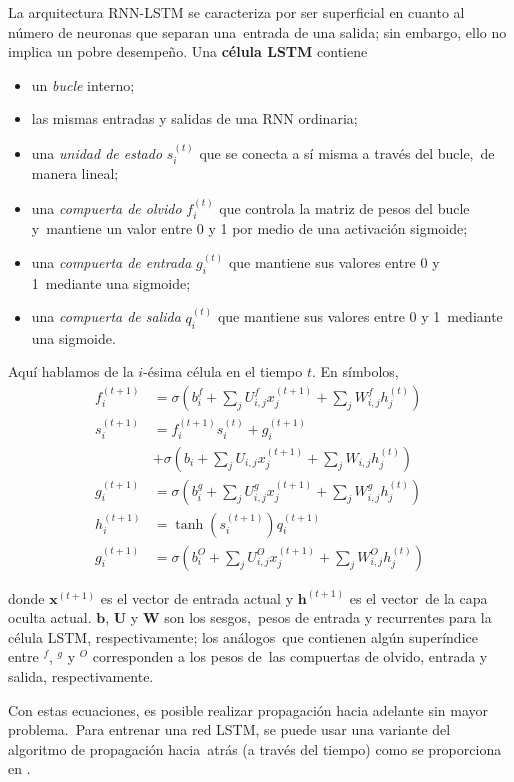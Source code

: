 La arquitectura RNN-LSTM se caracteriza por ser superficial en cuanto al número de neuronas que separan una\
entrada de una salida; sin embargo, ello no implica un pobre desempeño. Una \textbf{célula LSTM} contiene\
\begin{itemize}
\item un \emph{bucle} interno;
\item las mismas entradas y salidas de una RNN ordinaria;
\item una \emph{unidad de estado} $s_i^{(t)}$ que se conecta a sí misma a través del bucle,\
  de manera lineal;
\item una \emph{compuerta de olvido} $f_i^{(t)}$ que controla la matriz de pesos del bucle y\
  mantiene un valor entre 0 y 1 por medio de una activación sigmoide;
\item una \emph{compuerta de entrada} $g_i^{(t)}$ que mantiene sus valores entre 0 y 1\
  mediante una sigmoide;
\item una \emph{compuerta de salida} $q_i^{(t)}$ que mantiene sus valores entre 0 y 1\
  mediante una sigmoide.
\end{itemize}\par
Aquí hablamos de la $i$-ésima célula en el tiempo $t$. En símbolos,
\begin{align}
  f_i^{(t+1)} &= \sigma\left(b_i^f + \sum_j U_{i,j}^f x_j^{(t+1)} + \sum_j W_{i,j}^f h_j^{(t)}\right)\\
  s_i^{(t+1)} &= f_i^{(t+1)} s_i^{(t)} + g_i^{(t+1)} \nonumber \\
  &+ \sigma\left(b_i + \sum_j U_{i,j} x_j^{(t+1)} + \sum_j W_{i,j} h_j^{(t)}\right)\\
  g_i^{(t+1)} &= \sigma\left(b_i^g + \sum_j U_{i,j}^g x_j^{(t+1)} + \sum_j W_{i,j}^g h_j^{(t)}\right)\\
  h_i^{(t+1)} &= \tanh(s_i^{(t+1)}) q_i^{(t+1)}\\
  g_i^{(t+1)} &= \sigma\left(b_i^O + \sum_j U_{i,j}^O x_j^{(t+1)} + \sum_j W_{i,j}^O h_j^{(t)}\right)
\end{align}\par
donde $\mathbf{x}^{(t+1)}$ es el vector de entrada actual y $\mathbf{h}^{(t+1)}$ es el vector\
de la capa oculta actual. $\mathbf{b}$, $\mathbf{U}$ y $\mathbf{W}$ son los sesgos,\
pesos de entrada y recurrentes para la célula LSTM, respectivamente; los análogos\
que contienen algún superíndice entre $^f$, $^g$ y $^O$ corresponden a los pesos de\
las compuertas de olvido, entrada y salida, respectivamente.\par
Con estas ecuaciones, es posible realizar propagación hacia adelante sin mayor problema.\
Para entrenar una red LSTM, se puede usar una variante del algoritmo de propagación hacia\
atrás (a través del tiempo) como se proporciona en \cite{hochreiter1997}.
